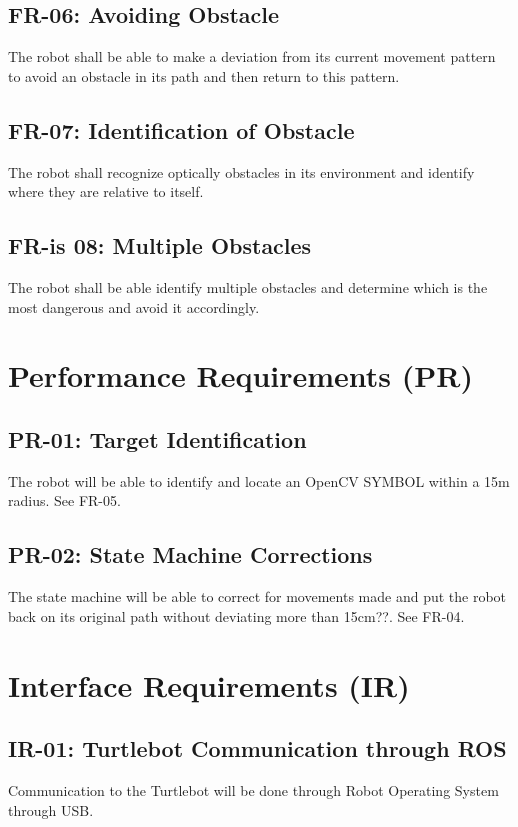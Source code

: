 \documentclass[]{report}
\begin{document}
\subsection{FR-06: Avoiding Obstacle}
The robot shall be able to make a deviation from its current movement pattern to avoid an obstacle in its path and then return to this pattern.

\subsection{FR-07: Identification of Obstacle}
The robot shall recognize optically obstacles in its environment and identify where they are relative to itself.

\subsection{FR-is 08: Multiple Obstacles}
The robot shall be able identify multiple obstacles and determine which is the most dangerous and avoid it accordingly. 


\section{Performance Requirements (PR)}

\subsection{PR-01: Target Identification}
The robot will be able to identify and locate an OpenCV SYMBOL within a 15m radius. See FR-05.

\subsection{PR-02: State Machine Corrections}
The state machine will be able to correct for movements made and put the robot back on its original path without deviating more than 15cm??. See FR-04.


\section{Interface Requirements (IR)}

\subsection{IR-01: Turtlebot Communication through ROS}
Communication to the Turtlebot will be done through Robot Operating System through USB.
\end{document}
